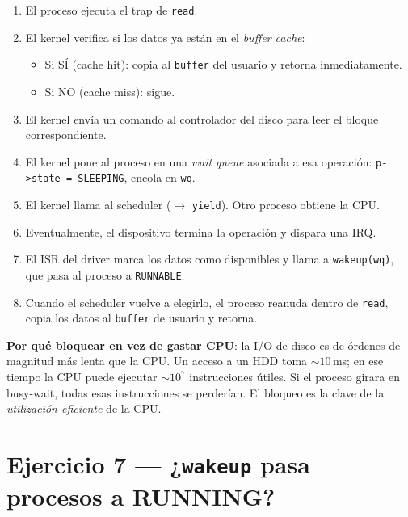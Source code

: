 \documentclass[11pt,a4paper]{article}
\begin{document}
\begin{enumerate}[leftmargin=*]
    \item El proceso ejecuta el trap de \texttt{read}.
    \item El kernel verifica si los datos ya están en el
        \emph{buffer cache}:
        \begin{itemize}[nosep]
            \item Si SÍ (cache hit): copia al \texttt{buffer} del
                usuario y retorna inmediatamente.
            \item Si NO (cache miss): sigue.
        \end{itemize}
    \item El kernel envía un comando al controlador del disco para
        leer el bloque correspondiente.
    \item El kernel pone al proceso en una \emph{wait queue}
        asociada a esa operación: \texttt{p->state = SLEEPING},
        encola en \texttt{wq}.
    \item El kernel llama al scheduler ($\to$ \texttt{yield}). Otro
        proceso obtiene la CPU.
    \item Eventualmente, el dispositivo termina la operación y
        dispara una IRQ.
    \item El ISR del driver marca los datos como disponibles y
        llama a \texttt{wakeup(wq)}, que pasa al proceso a
        \texttt{RUNNABLE}.
    \item Cuando el scheduler vuelve a elegirlo, el proceso reanuda
        dentro de \texttt{read}, copia los datos al \texttt{buffer}
        de usuario y retorna.
\end{enumerate}

\begin{idea}
\textbf{Por qué bloquear en vez de gastar CPU}: la I/O de disco es
de órdenes de magnitud más lenta que la CPU. Un acceso a un HDD
toma $\sim 10$\,ms; en ese tiempo la CPU puede ejecutar $\sim 10^7$
instrucciones útiles. Si el proceso girara en busy-wait, todas esas
instrucciones se perderían. El bloqueo es la clave de la
\emph{utilización eficiente} de la CPU.
\end{idea}

\section{Ejercicio 7 --- ¿\texttt{wakeup} pasa procesos a RUNNING?}
\end{document}
